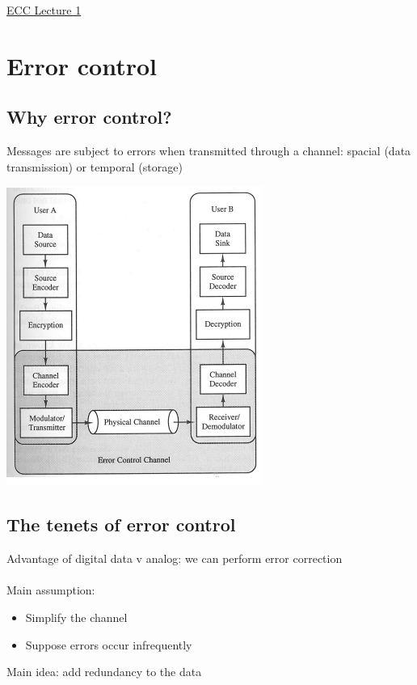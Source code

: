 \documentclass{article}[18pt]
\begin{document}
\begin{center}
\underline{\huge ECC Lecture 1}
\end{center}
\section{Error control}
\subsection{Why error control?}
Messages are subject to errors when transmitted through a channel: spacial (data transmission) or temporal (storage)
\begin{center}
	\includegraphics[scale=0.7]{ecc1}
\end{center}
\subsection{The tenets of error control}
Advantage of digital data v analog: we can perform error correction\\
\\
Main assumption:
\begin{itemize}
	\item Simplify the channel
	\item Suppose errors occur infrequently
\end{itemize}
Main idea: add redundancy to the data
\end{document}
